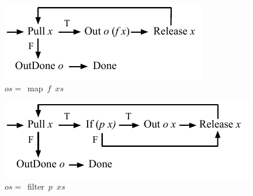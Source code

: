 

\begin{figure}
% 
% 
% 
% 

\centering
\includegraphics{machine/map}
\caption{$os =$~map~$f$~$xs$}
\label{fig:com:map}
\end{figure}

\begin{figure}
%
%
%
%

\centering
\includegraphics{machine/filter}
\caption{$os =$~filter~$p$~$xs$}
\label{fig:com:filter}
\end{figure}

